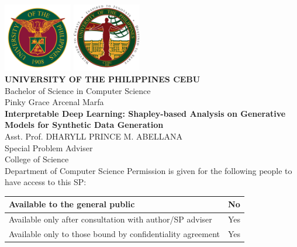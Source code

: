 \documentclass[11pt]{article}
\begin{document}
\begin{titlepage}
    \centering
    \includegraphics[height=3cm]{assets/up-logo.png}
    \includegraphics[height=3cm]{assets/upc-logo.png} \\ [0.5cm]

    \Large \textbf{UNIVERSITY OF THE PHILIPPINES CEBU} \\
    \large Bachelor of Science in Computer Science \\
    \vfill
    \large Pinky Grace Arcenal Marfa \\
    \vfill
    \large \textbf{Interpretable Deep Learning: Shapley-based Analysis on Generative Models for Synthetic Data Generation}\\
    \vfill
    \large Asst. Prof. DHARYLL PRINCE M. ABELLANA \\
    \large Special Problem Adviser \\
    \vfill
    \large College of Science \\
    \large Department of Computer Science
    \vfill
    \large Permission is given for the following people to have access to this SP:

\begin{table}[H]
    \centering
    \renewcommand{\arraystretch}{0.8} %
    \begin{tabular}{|>{\centering\arraybackslash}m{}|>{\centering\arraybackslash}m{}|}
        \hline
        Available to the general public & No \\ \hline
        Available only after consultation with author/SP adviser & Yes \\ \hline
        Available only to those bound by confidentiality agreement & Yes \\ \hline
    \end{tabular}
\end{table}


\end{titlepage}
\end{document}
